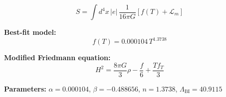 
\begin{equation}
  S = \int d^4x \, |e| \, \frac{1}{16\pi G} \left[ f(T) + \mathcal{L}_m \right]
\end{equation}

\textbf{Best-fit model:}
\begin{equation}
  f(T) = 0.000104 \, T^{1.3738}
\end{equation}

\textbf{Modified Friedmann equation:}
\begin{equation}
  H^2 = \frac{8\pi G}{3} \rho - \frac{f}{6} + \frac{T f_T}{3}
\end{equation}

\textbf{Parameters:}
$\alpha = 0.000104$, \quad
$\beta = -0.488656$, \quad
$n = 1.3738$, \quad
$\Lambda_{\text{BI}} = 40.9115$